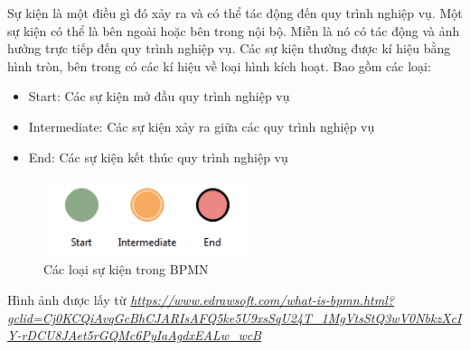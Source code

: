 Sự kiện là một điều gì đó xảy ra và có thể tác động đến quy trình nghiệp vụ. Một sự kiện có thể là bên ngoài hoặc bên trong nội bộ. Miễn là nó có tác động và ảnh hưởng trực tiếp đến quy trình nghiệp vụ. Các sự kiện thường được kí hiệu bằng hình tròn, bên trong có các kí hiệu về loại hình kích hoạt. Bao gồm các loại:
\begin{itemize}
	\item Start: Các sự kiện mở đầu quy trình nghiệp vụ
	\item Intermediate: Các sự kiện xảy ra giữa các quy trình nghiệp vụ
	\item End: Các sự kiện kết thúc quy trình nghiệp vụ
\end{itemize}
\begin{figure}[!htp]
	\begin{center}
		\includegraphics[width=6cm]{img/theory/BPMN/Event.png}
	\end{center}
	\caption{Các loại sự kiện trong BPMN}
\end{figure}
\begin{flushleft}
	Hình ảnh được lấy từ \textit{\url{https://www.edrawsoft.com/what-is-bpmn.html?gclid=Cj0KCQiAvqGcBhCJARIsAFQ5ke5U9xsSqU24T_1MgVtsStQ3wV0NbkzXcIY-rDCU8JAet5rGQMc6PyIaAgdxEALw_wcB}}
\end{flushleft}



